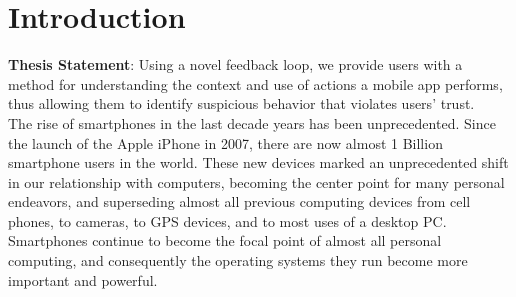 \chapter{Introduction}
\label{sec:intro}

\textbf{Thesis Statement}: Using a novel feedback loop, we provide users with a method for understanding the context and use of actions a mobile app performs, thus allowing them to identify suspicious behavior that violates users' trust.\\


The rise of smartphones in the last decade years has been unprecedented. Since the launch of the Apple iPhone in 2007, there are now almost 1 Billion smartphone users in the world\citep{kpcbinternetreport2012}. These new devices marked an unprecedented shift in our relationship with computers, becoming the center point for many personal endeavors, and superseding almost all previous computing devices from cell phones, to cameras, to GPS devices, and to most uses of a desktop PC\citep{hua2012introduction}. Smartphones continue to become the focal point of almost all personal computing, and consequently the operating systems they run become more important and powerful.

